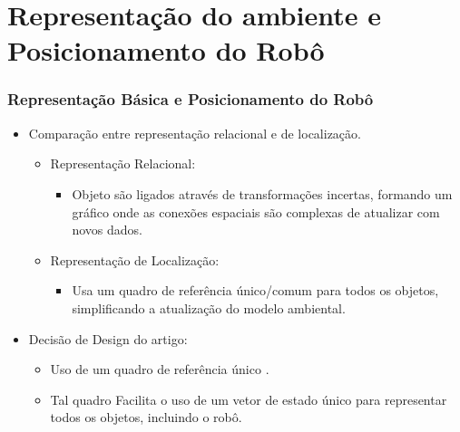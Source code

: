 \documentclass[xcolor=dvipsnames, aspectratio=169]{beamer}
\begin{document}
\section{Representação do ambiente e Posicionamento do Robô}
  \begin{frame}
  \frametitle{Representação Básica e Posicionamento do Robô}
  \begin{itemize}
      \item Comparação entre representação relacional e de localização.
      \begin{itemize}
        \item Representação Relacional: 
        \begin{itemize}
          \item Objeto são ligados através de transformações incertas, formando um gráfico onde as conexões espaciais são complexas de atualizar com novos dados. 
        \end{itemize}
        \item Representação de Localização:
        \begin{itemize}
          \item Usa um quadro de referência único/comum para todos os objetos, simplificando a atualização do modelo ambiental.
        \end{itemize}
      \end{itemize}
      \item Decisão de Design do artigo: 
      \begin{itemize}
        \item Uso de um quadro de referência único \cite{moutarlier2006experimental}.
        \item Tal quadro Facilita o uso de um vetor de estado único para representar todos os objetos, incluindo o robô.
      \end{itemize}
  \end{itemize}
\end{frame}
  

\end{document}
